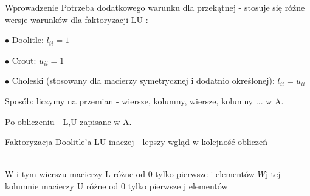 \begin{frame}{Wprowadzenie}
Potrzeba dodatkowego warunku dla przekątnej -
stosuje się różne wersje warunków dla faktoryzacji LU :

$\bullet$ Doolitle: $l_{ii}=1$

$\bullet$ Crout: $u_{ii}=1$

$\bullet$ Choleski (stosowany dla macierzy symetrycznej i dodatnio określonej): $l_{ii}=u_{ii}$

\newline
\vspace{0.5 cm}

Sposób: liczymy na przemian - wiersze, kolumny, wiersze, kolumny ... w A.

Po obliczeniu - L,U zapisane w A.
\end{frame}

\begin{frame}{Faktoryzacja Doolitle'a}
LU inaczej - lepszy wgląd w kolejność obliczeń

\newline
\\
W $\mathrm{i}$-tym wierszu macierzy $\mathrm{L}$ różne od $0$ tylko pierwsze $\mathrm{i}$ element\'{o}w $W\mathrm{j}$-tej kolumnie macierzy $\mathrm{U}$ różne od $0$ tylko pierwsze $\mathrm{j}$ elementów

\end{frame}

